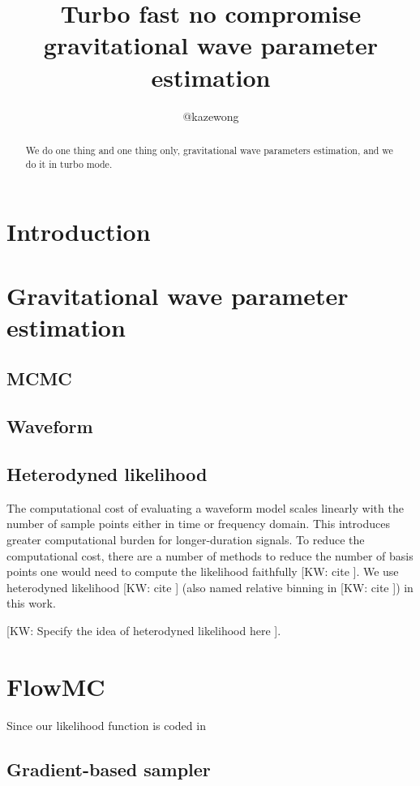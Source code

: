 \documentclass[twocolumn]{aastex631}
\newcommand{\kw}[1]{{\color{rb4}[KW: #1 ]}}
\begin{document}
\title{Turbo fast no compromise gravitational wave parameter estimation}

\author{@kazewong}

\begin{abstract}
We do one thing and one thing only, gravitational wave parameters estimation, and we do it in turbo mode.
\end{abstract}

\section{Introduction}
\label{sec:intro}

\section{Gravitational wave parameter estimation}

\subsection{MCMC}

\subsection{Waveform}

\subsection{Heterodyned likelihood}

The computational cost of evaluating a waveform model scales linearly with the number of sample points either in time or frequency domain.
This introduces greater computational burden for longer-duration signals.
To reduce the computational cost, there are a number of methods to reduce the number of basis points one would need to compute the likelihood faithfully \kw{cite}.
We use heterodyned likelihood \kw{cite} (also named relative binning in \kw{cite}) in this work.

\kw{Specify the idea of heterodyned likelihood here}.

\section{FlowMC}

Since our likelihood function is coded in 
\subsection{Gradient-based sampler}
\label{sec:gradient}
\end{document}
